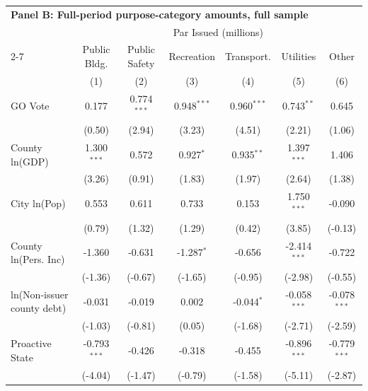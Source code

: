 \begingroup
\small
\centering
\begin{tabular*}{\textwidth}{@{\extracolsep{\fill}}lcccccc}
\multicolumn{7}{l}{\textbf{Panel B: Full-period purpose-category amounts, full sample}}\\

\addlinespace
   \toprule
    & \multicolumn{6}{c}{Par Issued (millions)}\\
   \cmidrule(lr){2-7}
                              & Public Bldg.   & Public Safety & Recreation    & Transport.    & Utilities      & Other \\   
                              & (1)            & (2)           & (3)           & (4)           & (5)            & (6)\\  
   \midrule 
   GO Vote                    & 0.177          & 0.774$^{***}$ & 0.948$^{***}$ & 0.960$^{***}$ & 0.743$^{**}$   & 0.645\\   
                              & (0.50)        & (2.94)       & (3.23)       & (4.51)       & (2.21)        & (1.06)\\   
   County ln(GDP)             & 1.300$^{***}$  & 0.572         & 0.927$^{*}$   & 0.935$^{**}$  & 1.397$^{***}$  & 1.406\\   
                              & (3.26)        & (0.91)       & (1.83)       & (1.97)       & (2.64)        & (1.38)\\   
   City ln(Pop)               & 0.553          & 0.611         & 0.733         & 0.153         & 1.750$^{***}$  & -0.090\\   
                              & (0.79)        & (1.32)       & (1.29)       & (0.42)       & (3.85)        & (-0.13)\\   
   County ln(Pers. Inc)       & -1.360         & -0.631        & -1.287$^{*}$  & -0.656        & -2.414$^{***}$ & -0.722\\   
                              & (-1.36)       & (-0.67)      & (-1.65)      & (-0.95)      & (-2.98)       & (-0.55)\\   
   ln(Non-issuer county debt) & -0.031         & -0.019        & 0.002         & -0.044$^{*}$  & -0.058$^{***}$ & -0.078$^{***}$\\   
                              & (-1.03)       & (-0.81)      & (0.05)       & (-1.68)      & (-2.71)       & (-2.59)\\   
   Proactive State            & -0.793$^{***}$ & -0.426        & -0.318        & -0.455        & -0.896$^{***}$ & -0.779$^{***}$\\   
                              & (-4.04)       & (-1.47)      & (-0.79)      & (-1.58)      & (-5.11)       & (-2.87)\\   

\end{tabular*}
